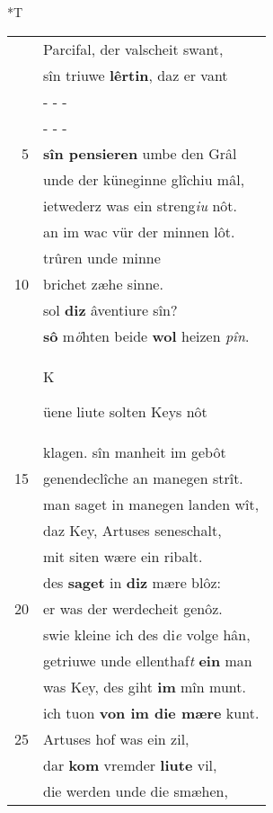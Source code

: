 \documentclass[8pt,a4paper,notitlepage]{article}
\begin{document}
\begin{table}[ht]
\begin{minipage}[t]{0.5\linewidth}
\end{minipage}
\hspace{0.5cm}
\begin{minipage}[t]{0.5\linewidth}
\small
\begin{center}*T
\end{center}
\begin{tabular}{rl}
 & Parcifal, der valscheit swant,\\ 
 & sîn triuwe \textbf{lêrtin}, daz er vant\\ 
 & \multicolumn{1}{l}{ - - - }\\ 
 & \multicolumn{1}{l}{ - - - }\\ 
5 & \textbf{sîn pensieren} umbe den Grâl\\ 
 & unde der küneginne glîchiu mâl,\\ 
 & ietwederz was ein streng\textit{iu} nôt.\\ 
 & an im wac vür der minnen lôt.\\ 
 & trûren unde minne\\ 
10 & brichet zæhe sinne.\\ 
 & sol \textbf{diz} âventiure sîn?\\ 
 & \textbf{sô} m\textit{ö}hten beide \textbf{wol} heizen \textit{pîn}.\\ 
 & \begin{large}K\end{large}üene liute solten Keys nôt\\ 
 & klagen. sîn manheit im gebôt\\ 
15 & genendeclîche an manegen strît.\\ 
 & man saget in manegen landen wît,\\ 
 & daz Key, Artuses seneschalt,\\ 
 & mit siten wære ein ribalt.\\ 
 & des \textbf{saget} in \textbf{diz} mære blôz:\\ 
20 & er was der werdecheit genôz.\\ 
 & swie kleine ich des di\textit{e} volge hân,\\ 
 & getriuwe unde ellenthaf\textit{t} \textbf{ein} man\\ 
 & was Key, des giht \textbf{im} mîn munt.\\ 
 & ich tuon \textbf{von im die mære} kunt.\\ 
25 & Artuses hof was ein zil,\\ 
 & dar \textbf{kom} vremder \textbf{liute} vil,\\ 
 & die werden unde die smæhen,\\ 

\end{tabular}
\end{minipage}
\end{table}
\end{document}
